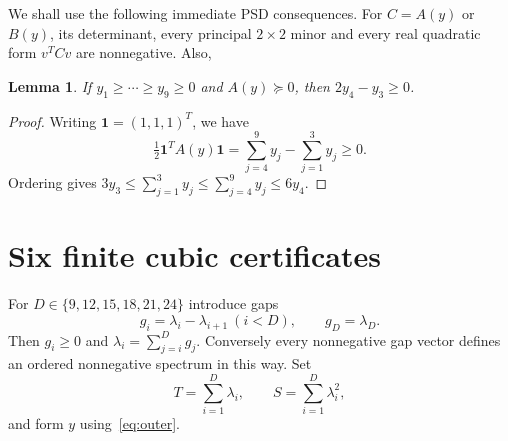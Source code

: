 \documentclass[11pt]{article}
\newtheorem{lemma}[theorem]{Lemma}
\theoremstyle{remark}\newtheorem{remark}[theorem]{Remark}
\begin{document}
We shall use the following immediate PSD consequences. For $C=A(y)$ or $B(y)$, its determinant, every principal $2\times2$ minor and every real quadratic form $v^TCv$ are nonnegative. Also,
\begin{lemma}\label{lem:ratio}
If $y_1\geq\cdots\geq y_9\geq0$ and $A(y)\succeq0$, then $2y_4-y_3\geq0$.
\end{lemma}
\begin{proof}
Writing $\boldsymbol1=(1,1,1)^T$, we have
\[
 \tfrac12\boldsymbol1^TA(y)\boldsymbol1
 =\sum_{j=4}^9y_j-\sum_{j=1}^3y_j\geq0.
\]
Ordering gives $3y_3\leq\sum_{j=1}^3y_j\leq\sum_{j=4}^9y_j\leq6y_4$.
\end{proof}

\section{Six finite cubic certificates}\label{sec:finite}
For $D\in\{9,12,15,18,21,24\}$ introduce gaps
\[
 g_i=\lambda_i-\lambda_{i+1}\ (i<D),\qquad g_D=\lambda_D.
\]
Then $g_i\geq0$ and $\lambda_i=\sum_{j=i}^Dg_j$. Conversely every nonnegative gap vector defines an ordered nonnegative spectrum in this way. Set
\[
 T=\sum_{i=1}^D\lambda_i,\qquad S=\sum_{i=1}^D\lambda_i^2,
\]
and form $y$ using~\eqref{eq:outer}.
\end{document}
